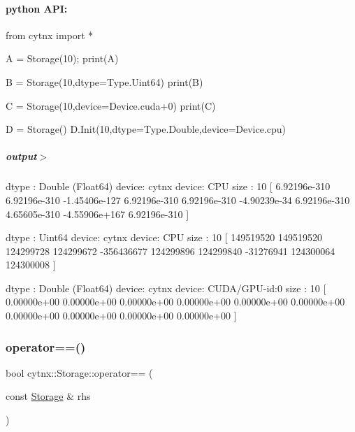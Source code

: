  \paragraph*{python A\+PI\+:}


\begin{DoxyCodeInclude}
\textcolor{keyword}{from} cytnx \textcolor{keyword}{import} *

A = Storage(10);
print(A)

B = Storage(10,dtype=Type.Uint64)
print(B)

C = Storage(10,device=Device.cuda+0)
print(C)

D = Storage()
D.Init(10,dtype=Type.Double,device=Device.cpu)


\end{DoxyCodeInclude}
 \subparagraph*{output$>$}


\begin{DoxyVerbInclude}
dtype : Double (Float64)
device: cytnx device: CPU
size  : 10
[ 6.92196e-310 6.92196e-310 -1.45406e-127 6.92196e-310 6.92196e-310 -4.90239e-34 6.92196e-310 4.65605e-310 -4.55906e+167 6.92196e-310 ]

dtype : Uint64
device: cytnx device: CPU
size  : 10
[           149519520           149519520           124299728           124299672          -356436677           124299896           124299840           -31276941           124300064           124300008  ]

dtype : Double (Float64)
device: cytnx device: CUDA/GPU-id:0
size  : 10
[ 0.00000e+00 0.00000e+00 0.00000e+00 0.00000e+00 0.00000e+00 0.00000e+00 0.00000e+00 0.00000e+00 0.00000e+00 0.00000e+00 ]




\end{DoxyVerbInclude}
 \mbox{\label{classcytnx_1_1Storage_ad304e00cf3d472ea0355af6b40c4529d}} 
\subsubsection{\texorpdfstring{operator==()}{operator==()}}
{\footnotesize\ttfamily bool cytnx\+::\+Storage\+::operator== (\begin{DoxyParamCaption}\item[{const \hyperlink{classcytnx_1_1Storage}{Storage} \&}]{rhs }\end{DoxyParamCaption})}



